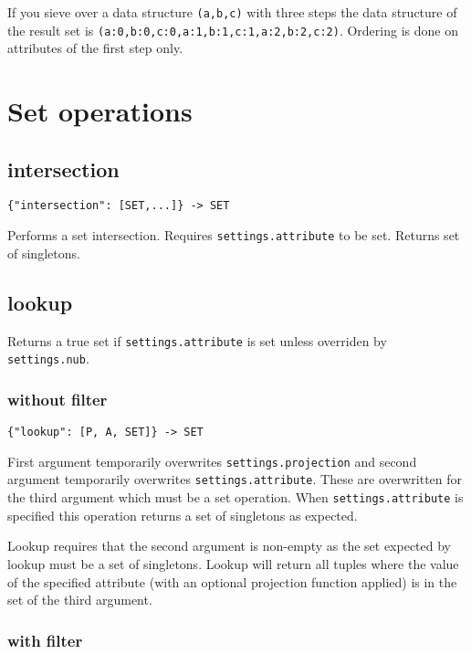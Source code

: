 \documentclass[a4paper]{article}
\begin{document}
If you sieve over a data structure \verb|(a,b,c)| with three steps the data structure of the result set is \verb|(a:0,b:0,c:0,a:1,b:1,c:1,a:2,b:2,c:2)|. 
Ordering is done on attributes of the first step only.

\section{Set operations}

\subsection{intersection}

\begin{verbatim}
{"intersection": [SET,...]} -> SET
\end{verbatim}

Performs a set intersection. Requires \verb|settings.attribute| to be
set. Returns set of singletons.

\subsection{lookup}

Returns a true set if \verb|settings.attribute| is set unless overriden by
\verb|settings.nub|.

\subsubsection{without filter}

\begin{verbatim}
{"lookup": [P, A, SET]} -> SET
\end{verbatim}

First argument temporarily overwrites \verb|settings.projection| and
second argument temporarily overwrites
\verb|settings.attribute|. These are overwritten for the third
argument which must be a set operation. When \verb|settings.attribute|
is specified this operation returns a set of singletons as expected.

Lookup requires that the second argument is non-empty as the set
expected by lookup must be a set of singletons. Lookup will return all
tuples where the value of the specified attribute (with an optional
projection function applied) is in the set of the third argument.

\subsubsection{with filter}
\end{document}

